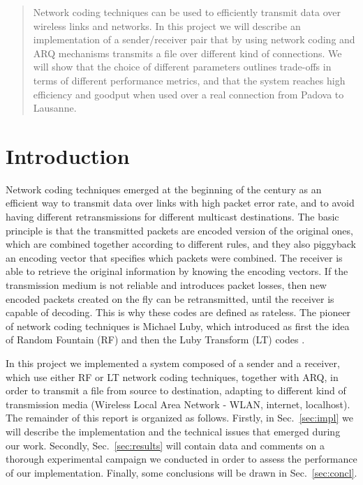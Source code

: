 \begin{abstract}
Network coding techniques can be used to efficiently transmit data over wireless links and networks. In this project we will describe an implementation of a sender/receiver pair that by using network coding and ARQ mechanisms transmits a file over different kind of connections. We will show that the choice of different parameters outlines trade-offs in terms of different performance metrics, and that the system reaches high efficiency and goodput when used over a real connection from Padova to Lausanne.
\end{abstract}

\section{Introduction}
Network coding techniques emerged at the beginning of the century as an efficient way to transmit data over links with high packet error rate, and to avoid having different retransmissions for different multicast destinations. The basic principle is that the transmitted packets are encoded version of the original ones, which are combined together according to different rules, and they also piggyback an encoding vector that specifies which packets were combined. The receiver is able to retrieve the original information by knowing the encoding vectors. If the transmission medium is not reliable and introduces packet losses, then new encoded packets created on the fly can be retransmitted, until the receiver is capable of decoding. This is why these codes are defined as rateless. The pioneer of network coding techniques is Michael Luby, which introduced as first the idea of Random Fountain (RF) \cite{rf} and then the Luby Transform (LT) codes \cite{lt}.

In this project we implemented a system composed of a sender and a receiver, which use either RF or LT network coding techniques, together with ARQ, in order to transmit a file from source to destination, adapting to different kind of transmission media (Wireless Local Area Network - WLAN, internet, localhost). The remainder of this report is organized as follows. Firstly, in Sec.~\ref{sec:impl} we will describe the implementation and the technical issues that emerged during our work. Secondly, Sec.~\ref{sec:results} will contain data and comments on a thorough experimental campaign we conducted in order to assess the performance of our implementation. Finally, some conclusions will be drawn in Sec.~\ref{sec:concl}.
